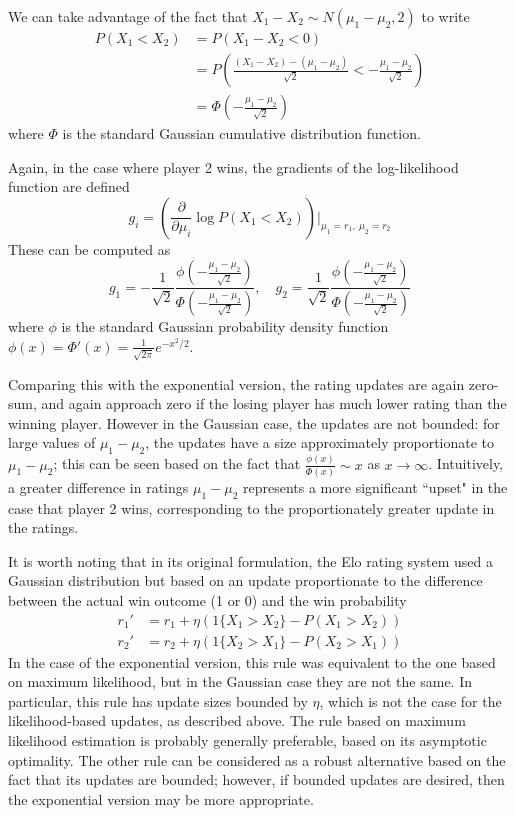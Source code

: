 \documentclass{article}
\begin{document}
	We can take advantage of the fact that $X_1 - X_2 \sim N(\mu_1 - \mu_2, 2)$ to write
	\begin{align*}
	P(X_1 < X_2) &= P(X_1 - X_2 < 0) \\
	&= P\left(\frac{(X_1 - X_2) - (\mu_1 - \mu_2)}{\sqrt 2} < -\frac{\mu_1 - \mu_2}{\sqrt 2}\right) \\
	&= \Phi\left(-\frac{\mu_1 - \mu_2}{\sqrt 2}\right)
	\end{align*}
	where $\Phi$ is the standard Gaussian cumulative distribution function.
	
	Again, in the case where player 2 wins, the gradients of the log-likelihood function are defined 
	$$g_i = \left(\frac{\partial}{\partial \mu_i} \log P(X_1 < X_2)\right) \bigg|_{\mu_1=r_1,\ \mu_2=r_2}$$
	These can be computed as
	$$
	g_1 = -\frac1{\sqrt 2}\frac{\phi\left(-\frac{\mu_1 - \mu_2}{\sqrt 2}\right)}{\Phi\left(-\frac{\mu_1 - \mu_2}{\sqrt 2}\right)},\quad
	g_2 = \frac1{\sqrt 2}\frac{\phi\left(-\frac{\mu_1 - \mu_2}{\sqrt 2}\right)}{\Phi\left(-\frac{\mu_1 - \mu_2}{\sqrt 2}\right)}
	$$
	where $\phi$ is the standard Gaussian probability density function $\phi(x) = \Phi'(x) = \frac1{\sqrt{2\pi}}e^{-x^2/2}$.

	Comparing this with the exponential version, the rating updates are again zero-sum, and again approach zero if the losing player
	has much lower rating than the winning player. However in the Gaussian case, the updates are not bounded: for large values of $\mu_1 - \mu_2$,
	the updates have a size approximately proportionate to $\mu_1 - \mu_2$; this can be seen based on the fact that
	$\frac{\phi(x)}{\Phi(x)} \sim x$ as $x \to \infty$. Intuitively, a greater difference in ratings $\mu_1 - \mu_2$ represents
	a more significant ``upset" in the case that player 2 wins, corresponding to the proportionately greater update in the ratings.
	
	It is worth noting that in its original formulation, the Elo rating system used a Gaussian distribution but based on an update
	proportionate to the difference between the actual win outcome (1 or 0) and the win probability
	\begin{align*}
	r_1' &= r_1 + \eta(1\{X_1 > X_2\} - P(X_1 > X_2)) \\
	r_2' &= r_2 + \eta(1\{X_2 > X_1\} - P(X_2 > X_1))
	\end{align*}
	In the case of the exponential version, this rule was equivalent to the one based on maximum likelihood, but in the Gaussian case
	they are not the same. In particular, this rule has update sizes bounded by $\eta$, which is not the case for the likelihood-based
	updates, as described above. The rule based on maximum likelihood estimation is probably generally preferable, based on its asymptotic
	optimality. The other rule can be considered as a robust alternative based on the fact that its updates are bounded; however, if
	bounded updates are desired, then the exponential version may be more appropriate.
\end{document}
